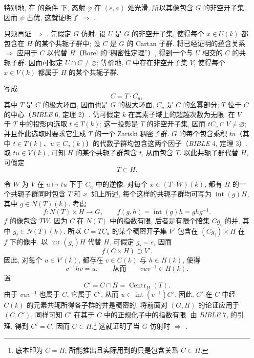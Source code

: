 特别地, 在  的条件  下, 态射 \(\varphi\) 在 \((e,a)\) 处光滑, 所以其像包含 \(G\) 的非空开子集. 因而 \(\psi\) 占优, 这就证明了  \(\Rightarrow\) .

只须再证  \(\Rightarrow\) . 先假定 \(G\) 仿射. 设 \(U\) 是 \(G\) 的非空开子集, 使得每个 \(x\in U(k)\) 都包含在 \(H\) 的某个共轭子群中; 设 \(C\) 是 \(G\) 的 Cartan 子群. 将已经证明的蕴含关系  \(\Rightarrow\)  应用于 \(C\) 以代替 \(H\)（Borel 的“稠密性定理”）, 得到一个与 \(U\) 相交的 \(C\) 的共轭子群. 因而可假定 \(U\cap C\neq\varnothing\); 等价地, \(C\) 中存在非空开子集 \(V\), 使得每个 \(x\in V(k)\) 都属于 \(H\) 的某个共轭子群.

写成
\[
  C=T\cdot C_u,
\]
其中 \(T\) 是 \(C\) 的极大环面, 因而也是 \(G\) 的极大环面, \(C_u\) 是 \(C\) 的幺幂部分; \(T\) 位于 \(C\) 的中心（\emph{BIBLE} 6, 定理 2）. 仍可假定 \(k\) 在其素子域上的超越次数为无限. 在 \(V\) 于 \(T\) 中的投影内选取 \(t\in T(k)\); 这一投影是 \(T\) 的非空开子集, 因而 \(tC_u\cap V\neq\varnothing\); 并且作此选取时要求它生成 \(T\) 的一个 Zariski 稠密子群. \(G\) 的每个包含乘积 \(tu\)（其中 \(t\in T(k)\)、\(u\in C_u(k)\)）的代数子群均包含这两个因子（\emph{BIBLE} 4, 定理 3）. 取 \(tu\in V(k)\), 可知 \(H\) 的某个共轭子群包含 \(t\), 从而包含 \(T\). 以此共轭子群代替 \(H\), 可假定
\[
  T\subset H.
\]

令 \(W\) 为 \(V\) 在 \(u\mapsto tu\) 下于 \(C_u\) 中的逆像. 对每个 \(x\in(T\cdot W)(k)\), 都有 \(H\) 的一个共轭子群同时包含 \(T\) 和 \(x\). 如上所述, 每个这样的共轭子群均可写为 \(\operatorname{int}(g)H\), 其中 \(g\in N(T)(k)\). 考虑
\[
  f:N(T)\times H\longrightarrow G,\qquad
  f(g,h)=\operatorname{int}(g)h=ghg^{-1}.
\]
\(f\) 的像包含 \(TW\). 因为 \(C\) 在 \(N(T)\) 中的指数有限, 后者是有限个陪集 \(Cg_i\) 的并, 其中 \(g_i\in N(T)(k)\). 所以 \(C=T C_u\) 的某个稠密开子集 \(V'\) 包含在 \((Cg_i)\times H\) 在 \(f\) 下的像中. 以 \(\operatorname{int}(g_i)H\) 代替 \(H\), 可假定 \(g_i=e\), 因而
\[
  f(C\times H)\supset V'.
\]
因此, 对每个 \(u\in V'(k)\), 都存在 \(v\in C(k)\) 与 \(h\in H(k)\), 使得
\[
  v^{-1}hv=u,\qquad\text{从而}\qquad vuv^{-1}\in H(k).
\]
置
\[
  C'=C\cap H=\operatorname{Centr}_H(T).
\]
由于 \(vuv^{-1}\) 也属于 \(C\), 它属于 \(C'\), 从而 \(u\in\operatorname{int}(v^{-1})C'\). 因此, \(C'\) 在 \(C\) 中经 \(C(k)\) 的元素共轭所得各子群的并是稠密的. 将前面对 \((G,H)\) 的论证应用于 \((C,C')\), 同样可知 \(C'\) 在其于 \(C\) 中的正规化子中的指数有限. 由 \emph{BIBLE} 7, 的引理, 得到 \(C'=C\), 因而 \(C\subset H\).\footnote{底本印为 \(C=H\); 所能推出且实际用到的只是包含关系 \(C\subset H\).} 这就证明了当 \(G\) 仿射时  \(\Rightarrow\) .

